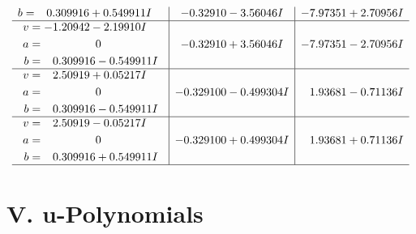 \documentclass[1p]{elsarticle_modified}
\theoremstyle{definition}
\begin{document}
$$\begin{array}{c|c|c}
\begin{aligned}
b &= \phantom{-}0.309916 + 0.549911 I\end{aligned}
 & -0.32910 - 3.56046 I & -7.97351 + 2.70956 I \\ \hline\begin{aligned}
v &= -1.20942 - 2.19910 I \\
a &= \phantom{-0.000000 } 0 \\
b &= \phantom{-}0.309916 - 0.549911 I\end{aligned}
 & -0.32910 + 3.56046 I & -7.97351 - 2.70956 I \\ \hline\begin{aligned}
v &= \phantom{-}2.50919 + 0.05217 I \\
a &= \phantom{-0.000000 } 0 \\
b &= \phantom{-}0.309916 - 0.549911 I\end{aligned}
 & -0.329100 - 0.499304 I & \phantom{-}1.93681 - 0.71136 I \\ \hline\begin{aligned}
v &= \phantom{-}2.50919 - 0.05217 I \\
a &= \phantom{-0.000000 } 0 \\
b &= \phantom{-}0.309916 + 0.549911 I\end{aligned}
 & -0.329100 + 0.499304 I & \phantom{-}1.93681 + 0.71136 I\\
 \hline 
 \end{array}$$\newpage
\newpage\renewcommand{\arraystretch}{1}
\centering \section*{ V. u-Polynomials}
\end{document}
